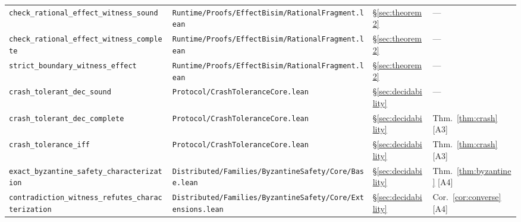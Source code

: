 \documentclass[a4paper,10pt,twocolumn,english]{article}
\numberwithin{equation}{section}
\theoremstyle{paperdef}
\theoremstyle{paperplain}
\theoremstyle{paperdef}
\theoremstyle{paperremark}
\begin{document}
\begin{table}[H]
\begin{tabularx}{\textwidth}{L{0.27\textwidth}L{0.37\textwidth}L{0.06\textwidth}>{\raggedright\arraybackslash}X}
		\texttt{check\_rational\_effect\_\allowbreak witness\_sound}    & \texttt{Runtime/\allowbreak Proofs/\allowbreak EffectBisim/\allowbreak}\mbox{\texttt{RationalFragment.lean}}                      & \S\ref{sec:theorem2}     & ---                                                                               \\
		\texttt{check\_rational\_effect\_\allowbreak witness\_complete} & \texttt{Runtime/\allowbreak Proofs/\allowbreak EffectBisim/\allowbreak}\mbox{\texttt{RationalFragment.lean}}                      & \S\ref{sec:theorem2}     & ---                                                                               \\
		\texttt{strict\_boundary\_\allowbreak witness\_effect}          & \texttt{Runtime/\allowbreak Proofs/\allowbreak EffectBisim/\allowbreak}\mbox{\texttt{RationalFragment.lean}}                      & \S\ref{sec:theorem2}     & ---                                                                               \\
		\texttt{crash\_tolerant\_\allowbreak dec\_sound}                & \texttt{Protocol/\allowbreak}\mbox{\texttt{CrashToleranceCore.lean}}                                                                  & \S\ref{sec:decidability} & ---                                                                               \\
		\texttt{crash\_tolerant\_\allowbreak dec\_complete}             & \texttt{Protocol/\allowbreak}\mbox{\texttt{CrashToleranceCore.lean}}                                                              & \S\ref{sec:decidability} & Thm.~\ref{thm:crash} [A3]                                                         \\
		\texttt{crash\_tolerance\_iff}                                  & \texttt{Protocol/\allowbreak}\mbox{\texttt{CrashToleranceCore.lean}}                                                                  & \S\ref{sec:decidability} & Thm.~\ref{thm:crash} [A3]                                                         \\
		\texttt{exact\_byzantine\_safety\_\allowbreak characterization} & \texttt{Distributed/\allowbreak Families/\allowbreak ByzantineSafety/\allowbreak Core/\allowbreak}\mbox{\texttt{Base.lean}}      & \S\ref{sec:decidability} & Thm.~\ref{thm:byzantine} [A4]                                                     \\
		\texttt{contradiction\_witness\_\allowbreak refutes\_characterization} & \texttt{Distributed/\allowbreak Families/\allowbreak ByzantineSafety/\allowbreak Core/\allowbreak}\mbox{\texttt{Extensions.lean}} & \S\ref{sec:decidability} & Cor.~\ref{cor:converse} [A4]                                                      \\

\end{tabularx}
\end{table}
\end{document}
